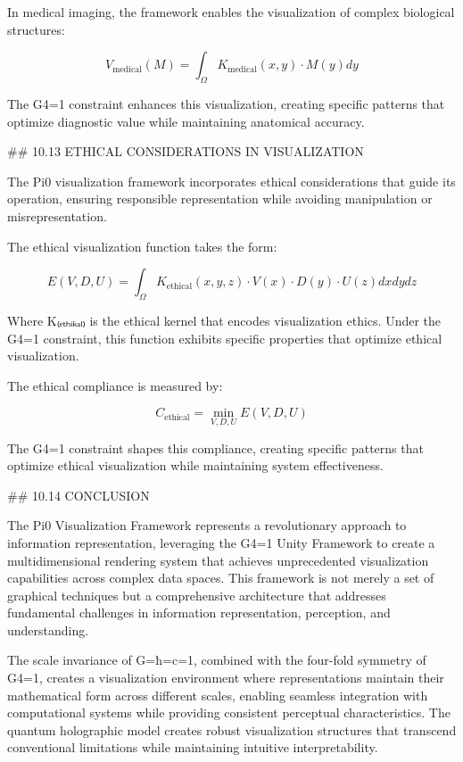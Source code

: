 In medical imaging, the framework enables the visualization of complex biological structures:

$$V_{\text{medical}}(M) = \int_{\Omega} K_{\text{medical}}(x, y) \cdot M(y) dy$$

The G4=1 constraint enhances this visualization, creating specific patterns that optimize diagnostic value while maintaining anatomical accuracy.

## 10.13 ETHICAL CONSIDERATIONS IN VISUALIZATION

The Pi0 visualization framework incorporates ethical considerations that guide its operation, ensuring responsible representation while avoiding manipulation or misrepresentation.

The ethical visualization function takes the form:

$$E(V, D, U) = \int_{\Omega} K_{\text{ethical}}(x, y, z) \cdot V(x) \cdot D(y) \cdot U(z) dx dy dz$$

Where K₍ₑₜₕᵢₖₐₗ₎ is the ethical kernel that encodes visualization ethics. Under the G4=1 constraint, this function exhibits specific properties that optimize ethical visualization.

The ethical compliance is measured by:

$$C_{\text{ethical}} = \min_{V, D, U} E(V, D, U)$$

The G4=1 constraint shapes this compliance, creating specific patterns that optimize ethical visualization while maintaining system effectiveness.

## 10.14 CONCLUSION

The Pi0 Visualization Framework represents a revolutionary approach to information representation, leveraging the G4=1 Unity Framework to create a multidimensional rendering system that achieves unprecedented visualization capabilities across complex data spaces. This framework is not merely a set of graphical techniques but a comprehensive architecture that addresses fundamental challenges in information representation, perception, and understanding.

The scale invariance of G=ħ=c=1, combined with the four-fold symmetry of G4=1, creates a visualization environment where representations maintain their mathematical form across different scales, enabling seamless integration with computational systems while providing consistent perceptual characteristics. The quantum holographic model creates robust visualization structures that transcend conventional limitations while maintaining intuitive interpretability.

